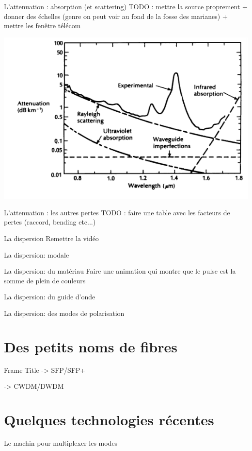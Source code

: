 \documentclass[aspectratio=149, 10pt, t]{beamer}
\begin{document}
\begin{frame}{L'attenuation : absorption (et scattering)}
    TODO : mettre la source proprement + donner des échelles (genre on peut voir au fond de la fosse des marianes) + mettre les fenêtre télécom

    \centering
    \includegraphics[width=0.7\linewidth]{images/absorption_fibre.png}

\end{frame}

\begin{frame}{L'attenuation : les autres pertes}
    TODO : faire une table avec les facteurs de pertes (raccord, bending etc...)
\end{frame}

\begin{frame}{La dispersion}
    Remettre la vidéo
\end{frame}

\begin{frame}{La dispersion: modale}

\end{frame}

\begin{frame}{La dispersion: du matériau}
    Faire une animation qui montre que le pulse est la somme de plein de couleurs
\end{frame}
\begin{frame}{La dispersion: du guide d'onde}
\end{frame}
\begin{frame}{La dispersion: des modes de polarisation}
\end{frame}


\section{Des petits noms de fibres}

\begin{frame}{Frame Title}
-> SFP/SFP+

-> CWDM/DWDM
    
\end{frame}

\section{Quelques technologies récentes}

%    

\begin{frame}{Le machin pour multiplexer les modes}
    
\end{frame}
\end{document}

